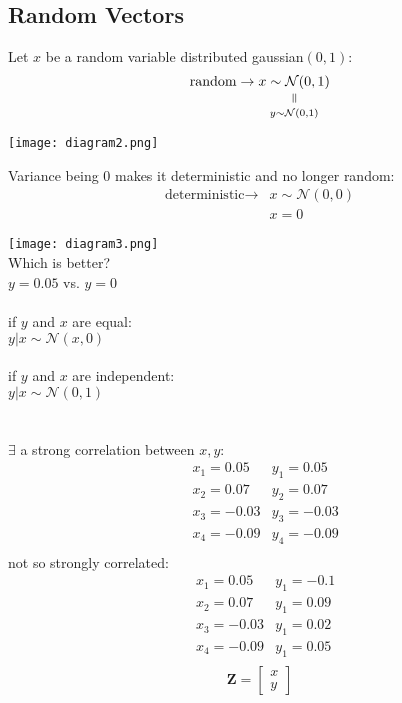 \documentclass{article}
\theoremstyle{definition}
\newcommand{\verteq}{\rotatebox{90}{$\,=$}}
\newcommand{\equalto}[2]{
  \underset{\scriptstyle\overset{\mkern4mu\verteq}{#2}}{#1}
}
\newcommand{\bs}[1]{\boldsymbol{#1}}
\begin{document}
    \subsection{Random Vectors}
      Let $x$ be a random variable distributed gaussian$(0,1)$:
      $$\textrm{random} \rightarrow
        \equalto{x \sim \mathcal{N}(0,1)}{y \sim \mathcal{N}(0,1)}$$
      \begin{center}
        \texttt{[image: diagram2.png]}
      \end{center}
      Variance being $0$ makes it deterministic and no longer random:
      \begin{align*}
        \textrm{deterministic} \rightarrow &x
        \sim \mathcal{N}(0,0) \\
        &x = 0
      \end{align*}
      \begin{center}
        \texttt{[image: diagram3.png]} \\
        Which is better?\\
        $y = 0.05$ vs. $y = 0$ \\ \ \\
        if $y$ and $x$ are equal: \\
        $y|x \sim \mathcal{N}(x,0)$ \\ \ \\
        if $y$ and $x$ are independent: \\
        $y|x \sim \mathcal{N}(0,1)$ \\ \ \\ \ \\
        $\exists$ a strong correlation between $x, y$: \\
        \begin{align*}
          &x_1 = 0.05  &y_1 = 0.05 \\
          &x_2 = 0.07  &y_2 = 0.07 \\
          &x_3 = -0.03  &y_3 = -0.03 \\
          &x_4 = -0.09  &y_4 = -0.09 \\
        \end{align*}
        not so strongly correlated:
        \begin{align*}
          &x_1 = 0.05  &y_1 = -0.1 \\
          &x_2 = 0.07  &y_1 = 0.09 \\
          &x_3 = -0.03  &y_1 = 0.02 \\
          &x_4 = -0.09  &y_1 = 0.05 \\
        \end{align*}
        $$\bs{Z} = \begin{bmatrix} x \\ y \end{bmatrix}$$
      \end{center}
\end{document}
